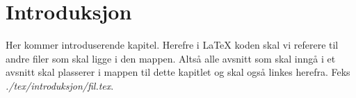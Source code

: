 \chapter{Introduksjon}
Her kommer introduserende kapitel. Herefre i \LaTeX{} koden skal vi referere til andre filer som skal ligge i den mappen. Altså alle avsnitt som skal inngå i et avsnitt skal plasserer i mappen til dette kapitlet og skal også linkes herefra. Feks \textit{./tex/introduksjon/fil.tex}.
